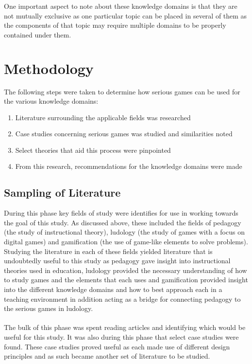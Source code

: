 \documentclass[conference]{IEEEtran}
\begin{document}
One important aspect to note about these knowledge domains is that they are not mutually exclusive as one particular topic can be placed in several of them as the components of that topic may require multiple domains to be properly contained under them. 


\section{Methodology}
The following steps were taken to determine how serious games can be used for the various knowledge domains:

\begin{enumerate}
\item Literature surrounding the applicable fields was researched
\item Case studies concerning serious games was studied and similarities noted
\item Select theories that aid this process were pinpointed
\item From this research, recommendations for the knowledge domains were made
\end{enumerate}

\subsection{Sampling of Literature}
During this phase key fields of study were identifies for use in working towards the goal of this study. As discussed above, these included the fields of pedagogy (the study of instructional theory), ludology (the study of games with a focus on digital games) and gamification (the use of game-like elements to solve problems). Studying the literature in each of these fields yielded literature that is undoubtedly useful to this study as pedagogy gave insight into instructional theories used in education, ludology provided the necessary understanding of how to study games and the elements that each uses and gamification provided insight into the different knowledge domains and how to best approach each in a teaching environment in addition acting as a bridge for connecting pedagogy to the serious games in ludology. 
\\\\
The bulk of this phase was spent reading articles and identifying which would be useful for this study. It was also during this phase that select case studies were found. These case studies proved useful as each made use of different design principles and as such became another set of literature to be studied.
\end{document}
